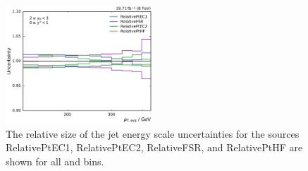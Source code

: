 \begin{figure}[htbp]
    \includegraphics[width=0.49\textwidth]{figures/measurement/jec_relunc_3_yb2ys0.pdf}
    \caption[Split-up of JEC sources: Part IV] {The relative size of the jet energy scale
             uncertainties for the sources RelativePtEC1, RelativePtEC2,
             RelativeFSR, and RelativePtHF are shown for all \ystar and \yboost bins.}

    \label{fig:jec_relunc_3}
\end{figure}

